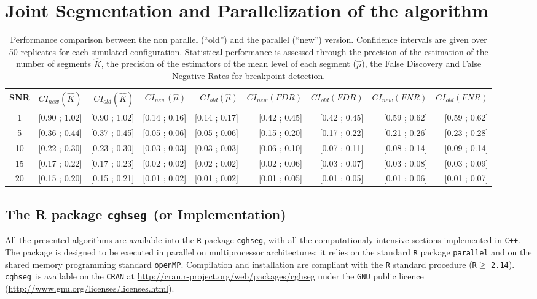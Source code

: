 \documentclass[article,10pt]{llncs}
\newcommand{\soft}{\texttt{cghseg}}
\newcommand{\esoft}{\texttt{cghseg }}
\begin{document}
\section{Joint Segmentation and Parallelization of the algorithm}



\begin{table}[ht]
\begin{center}
\begin{tabular}{|c|rr|rr|rr|rr|}
  \hline
SNR  &  $CI_{new}(\hat{K})$ & $CI_{old}(\hat{K})$ & $CI_{new}(\hat{\mu})$ & $CI_{old}(\hat{\mu})$ & $CI_{new}(FDR)$ & $CI_{old}(FDR)$   
     & $CI_{new}(FNR)$ & $CI_{old}(FNR)$  \\
  \hline
  1   & [0.90 ; 1.02] & [0.90 ; 1.02] & [0.14 ; 0.16] & [0.14 ; 0.17] & [0.42 ; 0.45] & [0.42 ; 0.45] & [0.59 ; 0.62] & [0.59 ; 0.62] \\ 
  5   & [0.36 ; 0.44] & [0.37 ; 0.45] & [0.05 ; 0.06] & [0.05 ; 0.06] & [0.15 ; 0.20] & [0.17 ; 0.22] & [0.21 ; 0.26] & [0.23 ; 0.28] \\ 
  10  & [0.22 ; 0.30] & [0.23 ; 0.30] & [0.03 ; 0.03] & [0.03 ; 0.03] & [0.06 ; 0.10] & [0.07 ; 0.11] & [0.08 ; 0.14] & [0.09 ; 0.14] \\ 
  15  & [0.17 ; 0.22] & [0.17 ; 0.23] & [0.02 ; 0.02] & [0.02 ; 0.02] & [0.02 ; 0.06] & [0.03 ; 0.07] & [0.03 ; 0.08] & [0.03 ; 0.09] \\ 
  20  & [0.15 ; 0.20] & [0.15 ; 0.21] & [0.01 ; 0.02] & [0.01 ; 0.02] & [0.01 ; 0.05] & [0.01 ; 0.05] & [0.01 ; 0.06] & [0.01 ; 0.07] \\ 
   \hline
\end{tabular}
\end{center}
\caption{Performance comparison between the non parallel (``old'') and the parallel (``new'') version. Confidence intervals are given over 50 replicates for each simulated configuration. Statistical performance is assessed through the precision of the estimation of the number of segments $\hat{K}$, the precision of the estimators of the mean level of each segment ($\hat{\mu}$), the False Discovery and False Negative Rates for breakpoint detection.} 
\end{table}

\subsection{The R package \esoft (or Implementation)}
All the presented algorithms are available into the \texttt{R} package \soft, with all the computationaly intensive sections implemented in \texttt{C++}.
The package is designed to be executed in parallel on multiprocessor architectures: 
it relies on the standard \texttt{R} package \texttt{parallel} and on the shared memory programming standard \texttt{openMP}.
Compilation and installation are compliant with the \texttt{R} standard procedure (\texttt{R}$\geq$ \texttt{2.14}). 
\esoft is available on the \texttt{CRAN} at \url{http://cran.r-project.org/web/packages/cghseg} under the \texttt{GNU} public licence 
(\url{http://www.gnu.org/licenses/licenses.html}).
\end{document}
